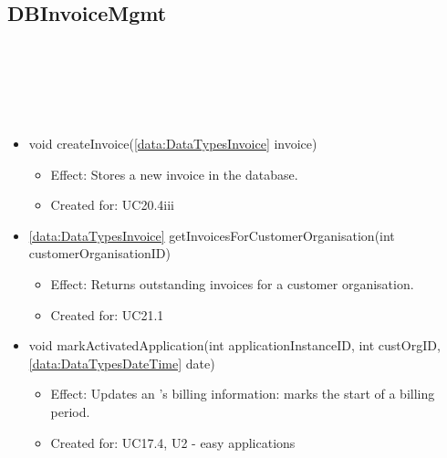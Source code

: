   \subsection{DBInvoiceMgmt}\label{int:OtherDataDatabaseOtherDataDBDBInvoiceMgmt}
    \begin{description}
      \item[Provided by:] \iconcomponent{}~
      \item[Required by:] \iconcomponent{}~
      \item[Operations:] ~
    \begin{itemize}[noitemsep,nolistsep,leftmargin=-.25cm]
      \item \textsf{void createInvoice(\ref{data:DataTypesInvoice} invoice)}
        \begin{itemize}[noitemsep,nolistsep]
           \item Effect: Stores a new invoice in the database.
\item Created for: UC20.4iii
        \end{itemize}
      \item \textsf{\ref{data:DataTypesInvoice} getInvoicesForCustomerOrganisation(int customerOrganisationID)}
        \begin{itemize}[noitemsep,nolistsep]
           \item Effect: Returns outstanding invoices for a customer organisation.
\item Created for: UC21.1
        \end{itemize}
      \item \textsf{void markActivatedApplication(int applicationInstanceID, int custOrgID, \ref{data:DataTypesDateTime} date)}
        \begin{itemize}[noitemsep,nolistsep]
           \item Effect: Updates an 's billing information: marks the start of a billing period.
\item Created for: UC17.4, U2 - easy applications
        \end{itemize}
    \end{itemize}
    \end{description}

